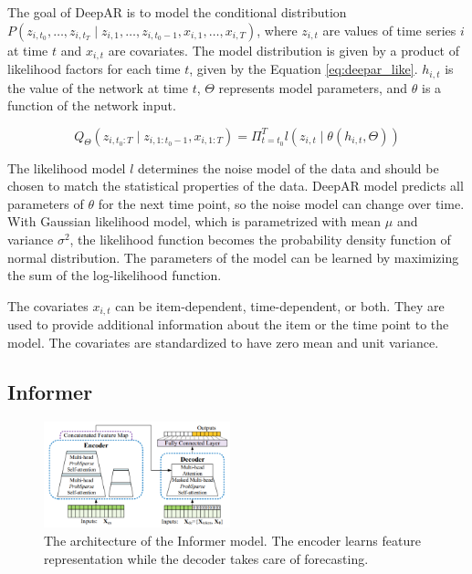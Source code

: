 \documentclass[conference]{IEEEtran}
\begin{document}
The goal of DeepAR is to model the conditional distribution $P(z_{i,t_{0}},\dots,z_{i, t_{T}} \mid z_{i,1},\dots,z_{i, t_{0}-1}, x_{i,1},\dots,x_{i, T})$, where $z_{i, t}$ are values of time series $i$ at time $t$ and $x_{i, t}$ are covariates.
The model distribution is given by a product of likelihood factors for each time $t$, given by the Equation \ref{eq:deepar_like}.
$h_{i, t}$ is the value of the network at time $t$, $\Theta$ represents model parameters, and $\theta$ is a function of the network input.

\begin{equation}
\label{eq:deepar_like}
    Q_{\Theta}(z_{i,t_{0}:T} \mid z_{i,1:t_{0}-1}, x_{i, 1:T}) = \Pi_{t=t_{0}}^{T}l(z_{i, t} \mid \theta(h_{i, t}, \Theta))
\end{equation}

The likelihood model $l$ determines the noise model of the data and should be chosen to match the statistical properties of the data.
DeepAR model predicts all parameters of $\theta$ for the next time point, so the noise model can change over time.
With Gaussian likelihood model, which is parametrized with mean $\mu$ and variance $\sigma^{2}$, the likelihood function becomes the probability density function of normal distribution.
The parameters of the model can be learned by maximizing the sum of the log-likelihood function.

The covariates $x_{i, t}$ can be item-dependent, time-dependent, or both.
They are used to provide additional information about the item or the time point to the model.
The covariates are standardized to have zero mean and unit variance.

\subsection{\textbf{Informer}}

\begin{figure}
    \centering
    \includegraphics[width=0.48\textwidth]{informer.png}
    \caption{The architecture of the Informer model. The encoder learns feature representation while the decoder takes care of forecasting.}
    \label{fig:informer}
\end{figure}
\end{document}
